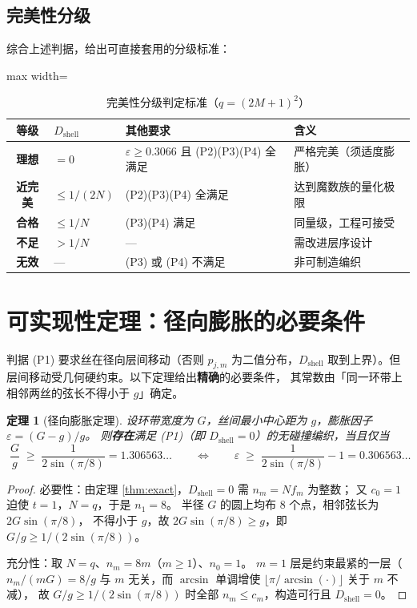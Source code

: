 \documentclass[12pt, a4paper]{ctexart}
\newtheorem{theorem}{定理}[section]
\begin{document}
\subsection{完美性分级}

综合上述判据，给出可直接套用的分级标准：

\begin{table}[htbp]
\centering
\caption{完美性分级判定标准（$q=(2M+1)^2$）}
\label{tab:grade}
\begin{adjustbox}{max width=\textwidth}
\begin{tabular}{clll}
\toprule
等级 & $D_{\mathrm{shell}}$ & 其他要求 & 含义 \\
\midrule
\textbf{理想} & $=0$ & $\varepsilon\ge0.3066$ 且 (P2)(P3)(P4) 全满足 & 严格完美（须适度膨胀）\\
\textbf{近完美} & $\le 1/(2N)$ & (P2)(P3)(P4) 全满足 & 达到魔数族的量化极限 \\
\textbf{合格} & $\le 1/N$ & (P3)(P4) 满足 & 同量级，工程可接受 \\
\textbf{不足} & $> 1/N$ & --- & 需改进层序设计 \\
\textbf{无效} & --- & (P3) 或 (P4) 不满足 & 非可制造编织 \\
\bottomrule
\end{tabular}
\end{adjustbox}
\end{table}

\section{可实现性定理：径向膨胀的必要条件}

判据 (P1) 要求丝在径向层间移动（否则 $p_{j,m}$ 为二值分布，$D_{\mathrm{shell}}$
取到上界）。但层间移动受几何硬约束。以下定理给出\textbf{精确}的必要条件，
其常数由「同一环带上相邻两丝的弦长不得小于 $g$」确定。

\begin{theorem}[径向膨胀定理]
\label{thm:dilation}
设环带宽度为 $G$，丝间最小中心距为 $g$，膨胀因子 $\varepsilon=(G-g)/g$。
则\textbf{存在}满足 (P1)（即 $D_{\mathrm{shell}}=0$）的无碰撞编织，当且仅当
\begin{equation}
\boxed{\;\frac{G}{g} \;\ge\; \frac{1}{2\sin(\pi/8)} = 1.306563\ldots
\qquad\Longleftrightarrow\qquad
\varepsilon \;\ge\; \frac{1}{2\sin(\pi/8)}-1 = 0.306563\ldots\;}
\label{eq:dilation}
\end{equation}
\end{theorem}

\begin{proof}
必要性：由定理 \ref{thm:exact}，$D_{\mathrm{shell}}=0$ 需 $n_m = Nf_m$ 为整数；
又 $c_0=1$ 迫使 $t=1$，$N=q$，于是 $n_1 = 8$。
半径 $G$ 的圆上均布 8 个点，相邻弦长为 $2G\sin(\pi/8)$，
不得小于 $g$，故 $2G\sin(\pi/8)\ge g$，即 $G/g \ge 1/(2\sin(\pi/8))$。

充分性：取 $N=q$、$n_m=8m$（$m\ge1$）、$n_0=1$。
$m=1$ 层是约束最紧的一层（$n_m/(mG) = 8/g$ 与 $m$ 无关，而
$\arcsin$ 单调增使 $\lfloor\pi/\arcsin(\cdot)\rfloor$ 关于 $m$ 不减），
故 $G/g \ge 1/(2\sin(\pi/8))$ 时全部 $n_m\le c_m$，构造可行且 $D_{\mathrm{shell}}=0$。
\end{proof}
\end{document}
